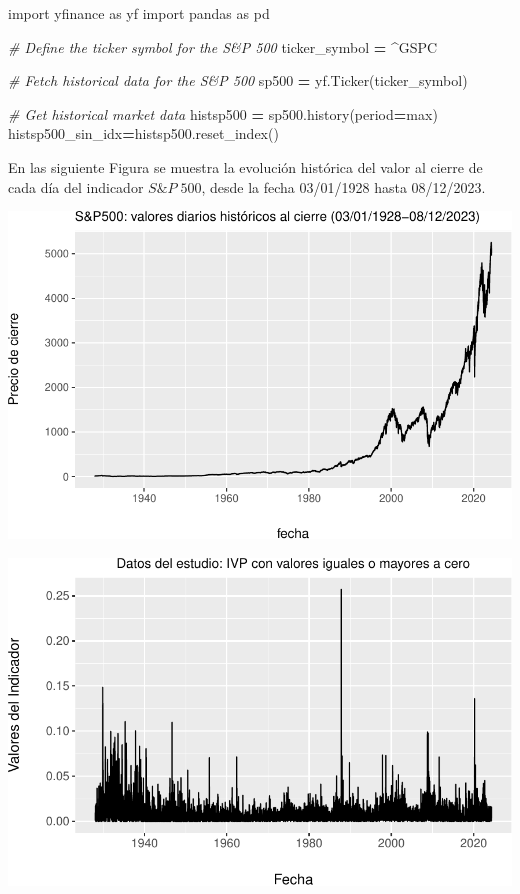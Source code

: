 \documentclass[
  12pt]{article}
\newenvironment{Shaded}{\begin{snugshade}}{\end{snugshade}}
\newcommand{\CommentTok}[1]{\textcolor[rgb]{0.56,0.35,0.01}{\textit{#1}}}
\newcommand{\ImportTok}[1]{#1}
\newcommand{\NormalTok}[1]{#1}
\newcommand{\OperatorTok}[1]{\textcolor[rgb]{0.81,0.36,0.00}{\textbf{#1}}}
\newcommand{\StringTok}[1]{\textcolor[rgb]{0.31,0.60,0.02}{#1}}
\begin{document}
\begin{Shaded}
\begin{Highlighting}[]
\ImportTok{import}\NormalTok{ yfinance }\ImportTok{as}\NormalTok{ yf}
\ImportTok{import}\NormalTok{ pandas }\ImportTok{as}\NormalTok{ pd}

\CommentTok{\# Define the ticker symbol for the S\&P 500}
\NormalTok{ticker\_symbol }\OperatorTok{=} \StringTok{\textquotesingle{}\^{}GSPC\textquotesingle{}}

\CommentTok{\# Fetch historical data for the S\&P 500}
\NormalTok{sp500 }\OperatorTok{=}\NormalTok{ yf.Ticker(ticker\_symbol)}

\CommentTok{\# Get historical market data}
\NormalTok{histsp500 }\OperatorTok{=}\NormalTok{ sp500.history(period}\OperatorTok{=}\StringTok{\textquotesingle{}max\textquotesingle{}}\NormalTok{)}
\NormalTok{histsp500\_sin\_idx}\OperatorTok{=}\NormalTok{histsp500.reset\_index()}
\end{Highlighting}
\end{Shaded}

En las siguiente Figura se muestra la evolución histórica del valor al
cierre de cada día del indicador \(S\&P\;500\), desde la fecha
03/01/1928 hasta 08/12/2023.

\includegraphics{Entrega_files/figure-latex/plot1-1.pdf}

\includegraphics{Entrega_files/figure-latex/unnamed-chunk-16-1.pdf}
\end{document}
